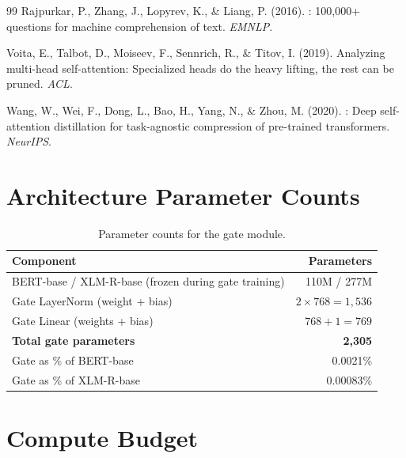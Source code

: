 \documentclass[11pt,a4paper]{article}
\begin{document}
\begin{thebibliography}{99}
Rajpurkar, P., Zhang, J., Lopyrev, K., \& Liang, P. (2016).
: 100,000+ questions for machine comprehension of text.
\newblock \emph{EMNLP}.

Voita, E., Talbot, D., Moiseev, F., Sennrich, R., \& Titov, I. (2019).
\newblock Analyzing multi-head self-attention: Specialized heads do the heavy lifting, the rest can be pruned.
\newblock \emph{ACL}.

Wang, W., Wei, F., Dong, L., Bao, H., Yang, N., \& Zhou, M. (2020).
: Deep self-attention distillation for task-agnostic compression of pre-trained transformers.
\newblock \emph{NeurIPS}.

\end{thebibliography}


\appendix

\section{Architecture Parameter Counts}
\label{app:params}

\begin{table}[h]
\centering
\begin{tabular}{@{}lr@{}}
\toprule
\textbf{Component} & \textbf{Parameters} \\
\midrule
BERT-base / XLM-R-base (frozen during gate training) & 110M / 277M \\
Gate LayerNorm (weight + bias)                        & $2 \times 768 = 1{,}536$ \\
Gate Linear (weights + bias)                          & $768 + 1 = 769$ \\
\textbf{Total gate parameters}                        & \textbf{2,305} \\
Gate as \% of BERT-base                               & 0.0021\% \\
Gate as \% of XLM-R-base                              & 0.00083\% \\
\bottomrule
\end{tabular}
\caption{Parameter counts for the gate module.}
\label{tab:params}
\end{table}


\section{Compute Budget}
\label{app:compute}
\end{document}
